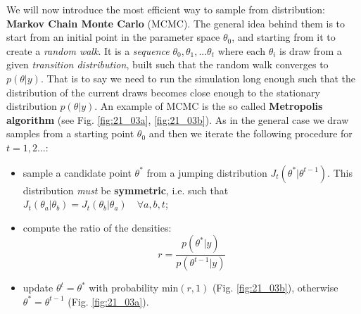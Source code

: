\documentclass[../main/main.tex]{subfiles}
\begin{document}
We will now introduce the most efficient way to sample from distribution: \textbf{Markov Chain Monte Carlo} (MCMC). The general idea behind them is to start from an initial point in the parameter space $\theta_0$, and starting from it to create a \textit{random walk}. It is a \textit{sequence} $\theta_0, \theta_1,...\theta_t$ where each $\theta_i$ is draw from a given \textit{transition distribution}, built such that the random walk converges to $p(\theta|y)$. That is to say we need to run the simulation long enough such that the distribution of the current draws becomes close enough to the stationary distribution $p(\theta|y)$.
An example of MCMC is the so called \textbf{Metropolis algorithm} (see Fig. \ref{fig:21_03a}, \ref{fig:21_03b}). As in the general case we draw samples from a starting point $\theta_0$ and then we iterate the following procedure for $t = 1, 2...$:
\begin{itemize}
    \item sample a candidate point $\theta^*$ from a jumping distribution $J_t(\theta^*|\theta^{t-1})$. This distribution \textit{must} be \textbf{symmetric}, i.e. such that $J_t(\theta_a|\theta_b) = J_t(\theta_b|\theta_a) \quad \forall a,b,t$;
    \item compute the ratio of the densities:
    \begin{equation*}
    r = \frac{p(\theta^*|y)}{p(\theta^{t-1}|y)}
    \end{equation*}
    \item update $\theta^t = \theta^*$ with probability $\text{min}(r,1)$ (Fig. \ref{fig:21_03b}), otherwise $\theta^* = \theta^{t-1}$ (Fig. \ref{fig:21_03a}).
\end{itemize}
\end{document}
